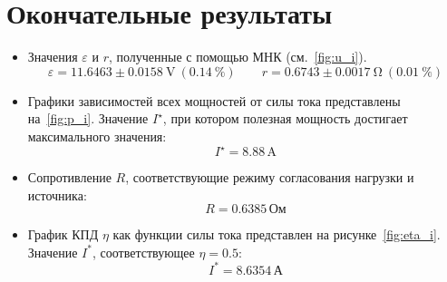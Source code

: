 \section{Окончательные результаты}
\begin{itemize}
	\item Значения $\varepsilon$ и $r$, полученные с помощью МНК (см.~\cref{fig:u_i}).
	      \[
          \varepsilon = \num{11.6463} \pm \SI{0.0158}{\volt} \: (\SI{0.14}{\percent})
		      \qquad
          r = \num{0.6743} \pm \SI{0.0017}{\ohm} \: (\SI{0.01}{\percent})
	      \]

	\item Графики зависимостей всех мощностей от силы тока представлены на~\cref{fig:p_i}.
	      Значение $I^\star$, при котором полезная мощность достигает максимального значения:
	      \[
		      I^\star = \num{8.88} \, \text{A}
	      \]

	\item Сопротивление $R$, соответствующие режиму согласования нагрузки и источника:
	      \[
		      R = \num{0.6385} \, \text{Ом}
	      \]

	\item График КПД $\eta$ как функции силы тока представлен на рисунке~\cref{fig:eta_i}.
	      Значение $I^*$, соответствующее $\eta = 0.5$:
	      \[
		      I^* = \num{8.6354} \, \text{А}
	      \]
\end{itemize}
